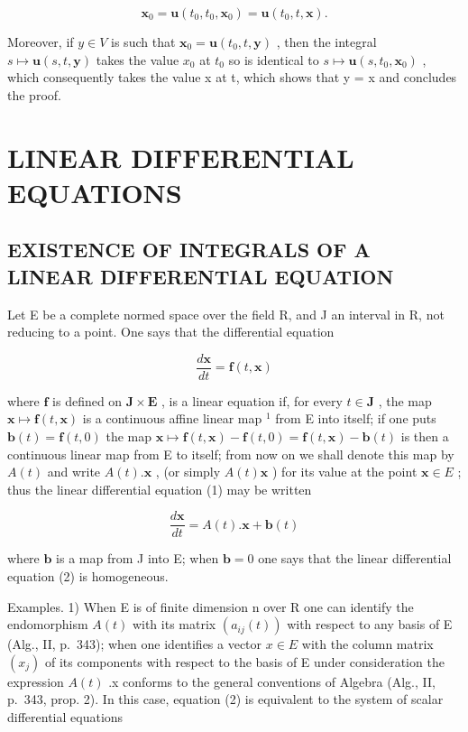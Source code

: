 \[
\mathbf {x} _ {0} = \mathbf {u} (t _ {0}, t _ {0}, \mathbf {x} _ {0}) = \mathbf {u} (t _ {0}, t, \mathbf {x}).
\]

Moreover, if \(y \in V\) is such that \(\mathbf{x}_{0} = \mathbf{u}(t_{0}, t, \mathbf{y})\) , then the integral \(s \mapsto \mathbf{u}(s, t, \mathbf{y})\) takes the value \(x_{0}\) at \(t_{0}\) so is identical to \(s \mapsto \mathbf{u}(s, t_{0}, \mathbf{x}_{0})\) , which consequently takes the value x at t, which shows that y = x and concludes the proof.

\section{LINEAR DIFFERENTIAL EQUATIONS}

\subsection{EXISTENCE OF INTEGRALS OF A LINEAR DIFFERENTIAL EQUATION}

Let E be a complete normed space over the field R, and J an interval in R, not reducing to a point. One says that the differential equation

\[
{\frac {d \mathbf {x}}{d t}} = \mathbf {f} (t, \mathbf {x})\tag{1}
\]

where \(\mathbf{f}\) is defined on \(\mathbf{J} \times \mathbf{E}\) , is a linear equation if, for every \(t \in \mathbf{J}\) , the map \(\mathbf{x} \mapsto \mathbf{f}(t, \mathbf{x})\) is a continuous affine linear map \(^1\) from E into itself; if one puts \(\mathbf{b}(t) = \mathbf{f}(t, 0)\) the map \(\mathbf{x} \mapsto \mathbf{f}(t, \mathbf{x}) - \mathbf{f}(t, 0) = \mathbf{f}(t, \mathbf{x}) - \mathbf{b}(t)\) is then a continuous linear map from E to itself; from now on we shall denote this map by \(A(t)\) and write \(A(t).\mathbf{x}\) , (or simply \(A(t)\mathbf{x}\) ) for its value at the point \(\mathbf{x} \in E\) ; thus the linear differential equation (1) may be written

\[
{\frac {d \mathbf {x}}{d t}} = A (t). \mathbf {x} + \mathbf {b} (t)\tag{2}
\]

where \(\mathbf{b}\) is a map from J into E; when \(\mathbf{b} = 0\) one says that the linear differential equation (2) is homogeneous.

Examples. 1) When E is of finite dimension n over R one can identify the endomorphism \(A(t)\) with its matrix \(\left(a_{ij}(t)\right)\) with respect to any basis of E (Alg., II, p.~343); when one identifies a vector \(x \in E\) with the column matrix \(\left(x_{j}\right)\) of its components with respect to the basis of E under consideration the expression \(A(t)\) .x conforms to the general conventions of Algebra (Alg., II, p.~343, prop. 2). In this case, equation (2) is equivalent to the system of scalar differential equations

